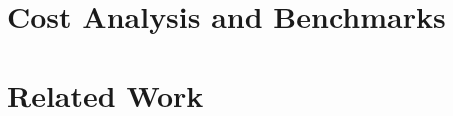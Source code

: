 \documentclass{article}
\newcommand{\jbel}[1]{{\color{blue}{}jbel: #1}}
\begin{document}



% 

\section{Cost Analysis and Benchmarks}
\label{sec:benchmarks}





\section{Related Work}


\medskip



\medskip



\medskip

% 
\end{document}
